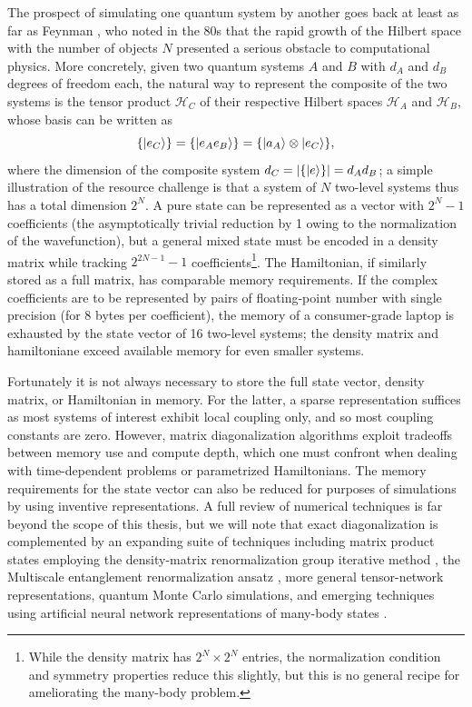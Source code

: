 	The prospect of simulating one quantum system by another goes back at least as far as Feynman \cite{feynman82}, who noted in the 80s that the rapid growth of the Hilbert space with the number of objects $N$ presented a serious obstacle to computational physics. More concretely, given two quantum systems $A$ and $B$ with $d_A$ and $d_B$ degrees of freedom each, the natural way to represent the composite of the two systems is the tensor product $\mathcal{H}_C$ of their respective Hilbert spaces $\mathcal{H}_A$ and $\mathcal{H}_B$, whose basis can be written as
	\begin{equation}
		\{|e_C\rangle\} = \{|e_A e_B\rangle\} = \{|a_A\rangle\otimes|e_C\rangle\},
	\end{equation}
	where the dimension of the composite system $d_C = |\{|e\rangle\}| = d_A d_B$; a simple illustration of the resource challenge is that a system of $N$ two-level systems thus has a total dimension $2^N$. A pure state can be represented as a vector with $2^N-1$ coefficients (the asymptotically trivial reduction by 1 owing to the normalization of the wavefunction), but a general mixed state must be encoded in a density matrix while tracking $2^{2N-1}-1$  coefficients\footnote{While the density matrix has $2^N\times2^N$ entries, the normalization condition and symmetry properties reduce this slightly, but this is no general recipe for ameliorating the many-body problem.}. The Hamiltonian, if similarly stored as a full matrix, has comparable memory requirements. If the complex coefficients are to be represented by pairs of floating-point number with single precision (for 8 bytes per coefficient), the memory of a consumer-grade laptop is exhausted by the state vector of 16 two-level systems; the density matrix and hamiltoniane exceed available memory for even smaller systems. 

	Fortunately it is not always necessary to store the full state vector, density matrix, or Hamiltonian in memory. For the latter, a sparse representation suffices as most systems of interest exhibit local coupling only, and so most coupling constants are zero. However, matrix diagonalization algorithms exploit tradeoffs between memory use and compute depth, which one must confront when dealing with time-dependent problems or parametrized Hamiltonians. The memory requirements for the state vector can also be reduced for purposes of simulations by using inventive representations. A full review of numerical techniques is far beyond the scope of this thesis, but we will note that exact diagonalization \cite{zhang10} is complemented by an expanding suite of techniques including matrix product states \cite{schollwoeck11} employing the density-matrix renormalization group iterative method \cite{dechiara08}, the Multiscale entanglement renormalization ansatz \cite{}, more general tensor-network representations, quantum Monte Carlo simulations, and emerging techniques using artificial neural network representations of many-body states \cite{}. 

